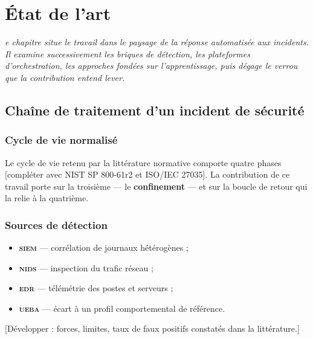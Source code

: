\let\textcircled=\pgftextcircled
\chapter{\'Etat de l'art}
\label{chap:etat-art}

\textit{e chapitre situe le travail dans le paysage de la r\'eponse
automatis\'ee aux incidents. Il examine successivement les briques de d\'etection,
les plateformes d'orchestration, les approches fond\'ees sur l'apprentissage, puis
d\'egage le verrou que la contribution entend lever.}

\minitoc
\newpage

\section{Cha\^ine de traitement d'un incident de s\'ecurit\'e}
\subsection{Cycle de vie normalis\'e}
Le cycle de vie retenu par la litt\'erature normative comporte quatre phases
[compl\'eter avec NIST SP 800-61r2 et ISO/IEC 27035]. La contribution de ce travail
porte sur la troisi\`eme --- le \textbf{confinement} --- et sur la boucle de retour
qui la relie \`a la quatri\`eme.

\subsection{Sources de d\'etection}
\begin{itemize}
  \item \textbf{\textsc{siem}} --- corr\'elation de journaux h\'et\'erog\`enes ;
  \item \textbf{\textsc{nids}} --- inspection du trafic r\'eseau ;
  \item \textbf{\textsc{edr}} --- t\'el\'em\'etrie des postes et serveurs ;
  \item \textbf{\textsc{ueba}} --- \'ecart \`a un profil comportemental de r\'ef\'erence.
\end{itemize}
[D\'evelopper : forces, limites, taux de faux positifs constat\'es dans la
litt\'erature.]

